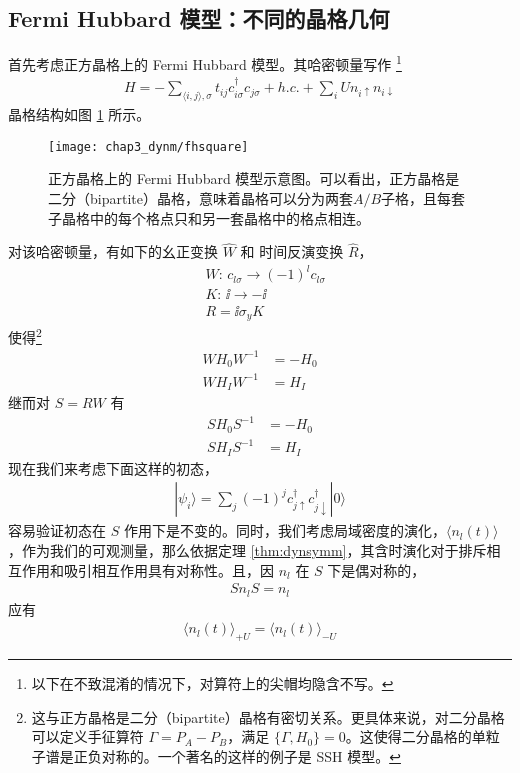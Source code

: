 \subsection{Fermi Hubbard 模型：不同的晶格几何}
首先考虑正方晶格上的 Fermi Hubbard 模型\cite{hubbard-expan-2010,hubbard-expan-2012}。其哈密顿量写作
\footnote{以下在不致混淆的情况下，对算符上的尖帽均隐含不写。}
\begin{align}
    H=-\sum_{\langle i,j\rangle,\sigma}t_{ij}c_{i\sigma}^{\dagger}c_{j\sigma}+h.c.+\sum_iUn_{i\uparrow}n_{i\downarrow}
\end{align}
晶格结构如图 \ref{fig:dynm:fhsquare} 所示。
\begin{figure}[!htb]
\centering
\texttt{[image: chap3\_dynm/fhsquare]}
\caption{正方晶格上的 Fermi Hubbard 模型示意图。可以看出，正方晶格是二分（bipartite）晶格，意味着晶格可以分为两套$A/B$子格，且每套子晶格中的每个格点只和另一套晶格中的格点相连。}
\label{fig:dynm:fhsquare}
\end{figure}
对该哈密顿量，有如下的幺正变换 $\hat{W}$ 和 时间反演变换 $\hat{R}$，
\begin{align}
& W: \, c_{l\sigma}\rightarrow (-1)^lc_{l\sigma} \\
& K: \,\ii\rightarrow-\ii \\
& R = \ii\sigma_yK 
\end{align}
使得\footnote{这与正方晶格是二分（bipartite）晶格有密切关系。更具体来说，对二分晶格可以定义手征算符 $\Gamma=P_A-P_B$，满足 $\{\Gamma, H_0\}=0$。这使得二分晶格的单粒子谱是正负对称的。一个著名的这样的例子是 SSH 模型。}
\begin{align}
WH_0W^{-1} &= -H_0 \\ 
WH_IW^{-1} &= H_I
\end{align}
继而对 $S=RW$ 有
\begin{align}
SH_0S^{-1} &= -H_0 \\ 
SH_IS^{-1} &= H_I
\end{align}
现在我们来考虑下面这样的初态，
\begin{align}
    |\psi_i\rangle=\sum_j (-1)^jc_{j\uparrow}^{\dagger}c_{j\downarrow}^{\dagger}|0\rangle
\end{align}
容易验证初态在 $S$ 作用下是不变的。同时，我们考虑局域密度的演化，$\langle n_l(t)\rangle$，作为我们的可观测量，那么依据定理 \ref{thm:dynsymm}，其含时演化对于排斥相互作用和吸引相互作用具有对称性。且，因 $n_l$ 在 $S$ 下是偶对称的，
\begin{align}
Sn_lS = n_l
\end{align}
应有
\begin{align}
\langle n_l(t)\rangle_{+U} = \langle n_l(t)\rangle_{-U}
\end{align}
